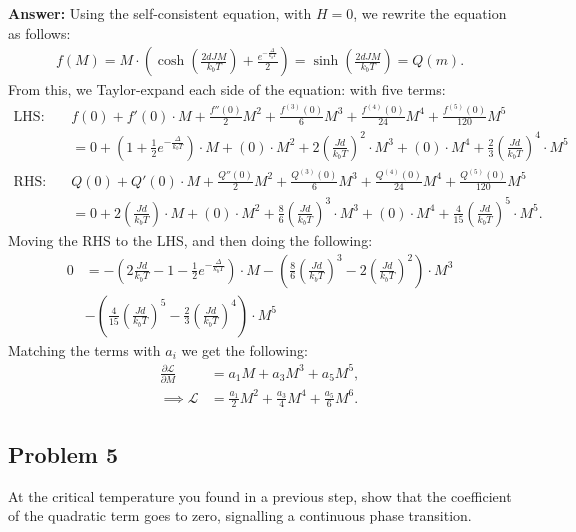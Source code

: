 \documentclass[a4paper]{article}
\newcommand{\newparagraph}{\vspace{.5cm}\noindent}
\newcommand{\fpartial}[2]{\frac{\partial #1}{\partial #2}}
\begin{document}
\newparagraph
\textbf{Answer:} Using the self-consistent equation, with $H = 0$, we rewrite the equation as follows:
\begin{align*}
    f(M) = M\cdot\left(\cosh\left(\frac{2dJM}{k_bT}\right) + \frac{e^{-\frac{\Delta}{k_bT}}}{2}\right) = \sinh\left(\frac{2dJM}{k_bT}\right) = Q(m).
\end{align*}From this, we Taylor-expand each side of the equation: with five terms:
\begin{align*}
    \text{LHS:}\quad & f(0) + f'(0)\cdot M + \frac{f''(0)}{2}M^2 + \frac{f^{(3)}(0)}{6}M^3 + \frac{f^{(4)}(0)}{24}M^4 + \frac{f^{(5)}(0)}{120}M^5\\
    &= 0 + \left(1 + \frac{1}{2}e^{-\frac{\Delta}{k_bT}}\right)\cdot M + (0)\cdot M^2 + 2\left(\frac{Jd}{k_bT}\right)^2\cdot M^3 + (0)\cdot M^4 + \frac{2}{3}\left(\frac{Jd}{k_bT}\right)^4\cdot M^5\\
    \text{RHS:}\quad & Q(0) + Q'(0)\cdot M + \frac{Q''(0)}{2}M^2 + \frac{Q^{(3)}(0)}{6}M^3 + \frac{Q^{(4)}(0)}{24}M^4 + \frac{Q^{(5)}(0)}{120}M^5\\
    &= 0 + 2\left(\frac{Jd}{k_bT}\right)\cdot M + \left(0\right)\cdot M^2 + \frac{8}{6}\left(\frac{Jd}{k_bT}\right)^3\cdot M^3 + (0)\cdot M^4 + \frac{4}{15}\left(\frac{Jd}{k_bT}\right)^5\cdot M^5.
\end{align*}Moving the RHS to the LHS, and then doing the following:
\begin{align*}
    0 &= -\left(2\frac{Jd}{k_bT} - 1 - \frac{1}{2}e^{-\frac{\Delta}{k_bT}}\right)\cdot M - \left(\frac{8}{6}\left(\frac{Jd}{k_bT}\right)^3 - 2\left(\frac{Jd}{k_bT}\right)^2\right)\cdot M^3\\
    &-\left(\frac{4}{15}\left(\frac{Jd}{k_bT}\right)^5 - \frac{2}{3}\left(\frac{Jd}{k_bT}\right)^4\right)\cdot M^5
\end{align*}Matching the terms with $a_i$ we get the following:
\begin{align*}
    \fpartial{\mathcal{L}}{M} &= a_1M + a_3M^3 + a_5M^5,\\
    \implies \mathcal{L} &= \frac{a_1}{2}M^2 + \frac{a_3}{4}M^4 + \frac{a_5}{6}M^6.
\end{align*}


\subsection*{Problem 5}
At the critical temperature you found in a previous step, show that the coefficient of the quadratic term goes to zero, signalling a continuous phase transition.
\end{document}
